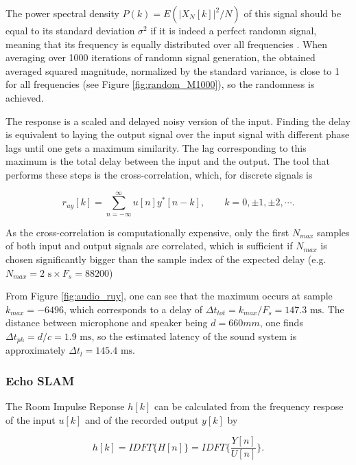 The power spectral density $P(k)=E(|X_N[k]|^2/N)$ of this signal should be equal to its standard deviation $\sigma^2$ if it is indeed a perfect randomn signal, meaning that its frequency is equally distributed over all frequencies \cite{Vetterli}.
When averaging over 1000 iterations of randomn signal generation, the obtained averaged squared magnitude, normalized by the standard variance, is close to 1 for all frequencies (see Figure \ref{fig:random_M1000}), so the randomness is achieved.

The response is a scaled and delayed noisy version of the input. 
Finding the delay is equivalent to laying the output signal over the input signal with different phase lags until one gets a maximum similarity. The lag corresponding to this maximum is the total delay between the input and the output. The tool that performs these steps is the cross-correlation, which, for discrete signals is 

\begin{equation}
	r_{uy}[k] = \sum\limits_{n=-\infty}^{\infty} u[n]y^*[n-k], \hspace{2em} k=0,\pm1,\pm2,\cdots .
\end{equation}

As the cross-correlation is computationally expensive, only the first $N_{max}$ samples of both input and output signals are correlated, which is sufficient if $N_{max}$ is chosen significantly bigger than the sample index of the expected delay (e.g. $N_{max}=2  \text{ s} \times F_s = 88200$)

From Figure \ref{fig:audio_ruy}, one can see that the maximum occurs at sample $k_{max}=-6496$, which corresponds to a delay of $\Delta t_{tot}=k_{max}/F_s=147.3 \text{ ms}$. 
The distance between microphone and speaker being $d=660mm$, one finds $\Delta t_{ph} = d/c=1.9  \text{ ms}$, so the estimated latency of the sound system is approximately $\Delta t_{l}=145.4 \text{ ms}$.

\subsubsection{Echo SLAM}

The Room Impulse Reponse $h[k]$ can be calculated from the frequency respose of the input $u[k]$ and of the recorded output $y[k]$ by

\begin{equation}
    h[k] = IDFT\{H[n]\} = IDFT\{\frac{Y[n]}{U[n]}\}.
    \label{eq:impulse}
\end{equation}

